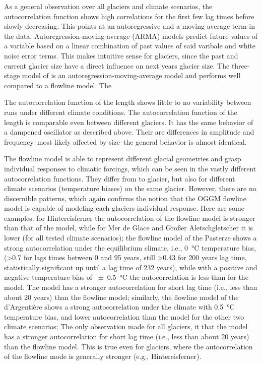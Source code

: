       As a general observation over all glaciers and climate scenarios, the autocorrelation function shows high correlations for the first few lag times before slowly decreasing. This points at an autoregressive and a moving-average term in the data. Autoregression-moving-average (ARMA) models predict future values of a variable based on a linear combination of past values of said varibale and white noise error terms. This makes intuitive sense for glaciers, since the past and current glacier size have a direct influence on next years glacier size. The three-stage model of \citet{Roe2014} is an autoregression-moving-average model and performs well compared to a flowline model. The 

      The autocorrelation function of the \vas{} length shows little to no variability between runs under different climate conditions. %
      The autocorrelation function of the \vas{} length is comparable even between different glaciers. It has the same behavior of a dampened oscillator as described above. Their are differences in amplitude and frequency--most likely affected by size--the general behavior is almost identical.
    
      The flowline model is able to represent different glacial geometries and grasp individual responses to climatic forcings, which can be seen in the vastly different autocorrelation functions. They differ from to glacier, but also for different climate scenarios (temperature biases) on the same glacier. However, there are no discernible patterns, which again confirms the notion that the OGGM flowline model is capable of modeling each glaciers individual response. Here are some examples: for Hintereisferner the autocorrelation of the flowline model is stronger than that of the \vas{} model, while for Mer de Glace and Großer Aletschgletscher it is lower (for all tested climate scenarios); the flowline model of the Pasterze shows a strong autocorrelation under the equilibrium climate, i.e., \SI{0}{\celsius} temperature bias, (>0.7 for lags times between 0 and 95 years, still >0.43 for 200 years lag time, statistically significant up until a lag time of 232 years), while with a positive and negative temperature bias of \SI{\pm0.5}{\celsius} the autocorrelation is less than for the \vas{} model.
      The \vas{} model has a stronger autocorrelation for short lag time (i.e., less than about 20 years) than the flowline model; similarly, the flowline model of the d'Argentière shows a strong autocorrelation under the climate with \SI{+0.5}{\celsius} temperature bias, and lower autocorrelation than the \vas{} model for the other two climate scenarios; The only observation made for all glaciers, it that the \vas{} model has a stronger autocorrelation for short lag time (i.e., less than about 20 years) than the flowline model. This is true even for glaciers, where the autocorrelation of the flowline mode is generally stronger (e.g., Hintereisferner). 

